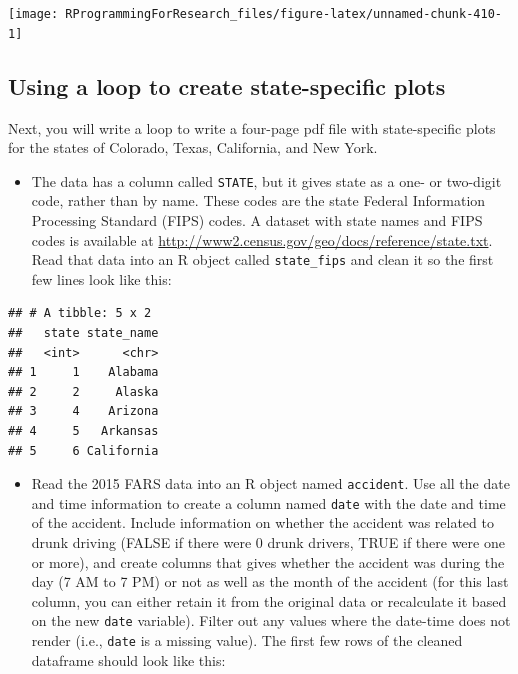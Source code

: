\documentclass[]{book}
\providecommand{\tightlist}{%
  \setlength{\itemsep}{0pt}\setlength{\parskip}{0pt}}
\theoremstyle{definition}
\theoremstyle{definition}
\theoremstyle{definition}
\theoremstyle{remark}
\begin{document}
\begin{center}\texttt{[image: RProgrammingForResearch\_files/figure-latex/unnamed-chunk-410-1]} \end{center}

\subsection{Using a loop to create state-specific
plots}\label{using-a-loop-to-create-state-specific-plots}

Next, you will write a loop to write a four-page pdf file with
state-specific plots for the states of Colorado, Texas, California, and
New York.

\begin{itemize}
\tightlist
\item
  The data has a column called \texttt{STATE}, but it gives state as a
  one- or two-digit code, rather than by name. These codes are the state
  Federal Information Processing Standard (FIPS) codes. A dataset with
  state names and FIPS codes is available at
  \url{http://www2.census.gov/geo/docs/reference/state.txt}. Read that
  data into an R object called \texttt{state\_fips} and clean it so the
  first few lines look like this:
\end{itemize}

\begin{verbatim}
## # A tibble: 5 x 2
##   state state_name
##   <int>      <chr>
## 1     1    Alabama
## 2     2     Alaska
## 3     4    Arizona
## 4     5   Arkansas
## 5     6 California
\end{verbatim}

\begin{itemize}
\tightlist
\item
  Read the 2015 FARS data into an R object named \texttt{accident}. Use
  all the date and time information to create a column named
  \texttt{date} with the date and time of the accident. Include
  information on whether the accident was related to drunk driving
  (FALSE if there were 0 drunk drivers, TRUE if there were one or more),
  and create columns that gives whether the accident was during the day
  (7 AM to 7 PM) or not as well as the month of the accident (for this
  last column, you can either retain it from the original data or
  recalculate it based on the new \texttt{date} variable). Filter out
  any values where the date-time does not render (i.e., \texttt{date} is
  a missing value). The first few rows of the cleaned dataframe should
  look like this:
\end{itemize}
\end{document}
